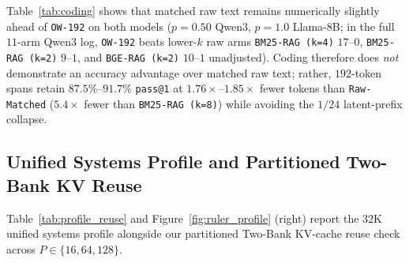 \documentclass[11pt]{article}
\renewcommand{\_}{\origunderscore\allowbreak}
\begin{document}
Table~\ref{tab:coding} shows that matched raw text remains numerically slightly ahead of \texttt{OW-192} on both models ($p=0.50$ Qwen3, $p=1.0$ Llama-8B; in the full $11$-arm Qwen3 log, \texttt{OW-192} beats lower-$k$ raw arms \texttt{BM25-RAG (k=4)} $17$--$0$, \texttt{BM25-RAG (k=2)} $9$--$1$, and \texttt{BGE-RAG (k=2)} $10$--$1$ unadjusted). Coding therefore does \emph{not} demonstrate an accuracy advantage over matched raw text; rather, $192$-token spans retain $87.5\%$--$91.7\%$ \texttt{pass@1} at $1.76\times$--$1.85\times$ fewer tokens than \texttt{Raw-Matched} ($5.4\times$ fewer than \texttt{BM25-RAG (k=8)}) while avoiding the $1/24$ latent-prefix collapse.

\subsection{Unified Systems Profile and Partitioned Two-Bank KV Reuse}
\label{sec:twobank}
Table~\ref{tab:profile_reuse} and Figure~\ref{fig:ruler_profile} (right) report the $32\text{K}$ unified systems profile alongside our partitioned Two-Bank KV-cache reuse check across $P \in \{16, 64, 128\}$.
\end{document}
